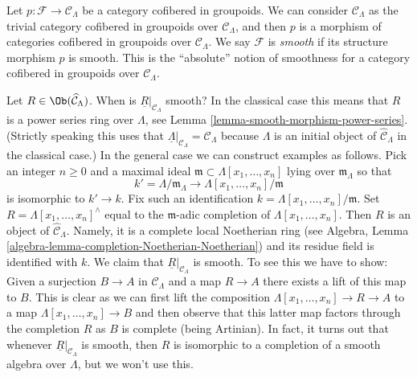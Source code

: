 \begin{remark}
\label{remark-cofibered-groupoid-projection-smooth}
Let $p : \mathcal{F} \to \mathcal{C}_\Lambda$ be a category cofibered in
groupoids. We can consider $\mathcal{C}_\Lambda$ as the trivial category
cofibered in groupoids over $\mathcal{C}_\Lambda$, and then $p$ is a morphism
of categories cofibered in groupoids over $\mathcal{C}_\Lambda$. We say
$\mathcal{F}$ is {\it smooth} if its structure morphism $p$ is smooth.
This is the ``absolute'' notion of smoothness for a category cofibered in
groupoids over $\mathcal{C}_\Lambda$.
\end{remark}

\begin{example}
\label{example-smooth}
Let $R \in \Ob(\widehat{\mathcal{C}}_\Lambda)$.
When is $\underline{R}|_{\mathcal{C}_\Lambda}$ smooth?
In the classical case this means that $R$ is a power series
ring over $\Lambda$, see
Lemma \ref{lemma-smooth-morphism-power-series}.
(Strictly speaking this uses that
$\underline{\Lambda}|_{\mathcal{C}_\Lambda} = \mathcal{C}_\Lambda$
because $\Lambda$ is an initial object of $\widehat{\mathcal{C}}_\Lambda$
in the classical case.) In the general case we can construct examples
as follows. Pick an integer $n \geq 0$ and a maximal ideal
$\mathfrak m \subset \Lambda[x_1, \ldots, x_n]$ lying over
$\mathfrak m_\Lambda$ so that
$$
k' = \Lambda/\mathfrak m_\Lambda
\longrightarrow
\Lambda[x_1, \ldots, x_n]/\mathfrak m
$$
is isomorphic to $k' \to k$. Fix such an identification
$k = \Lambda[x_1, \ldots, x_n]/\mathfrak m$. Set
$R = \Lambda[x_1, \ldots, x_n]^\wedge$ equal to the $\mathfrak m$-adic
completion of $\Lambda[x_1, \ldots, x_n]$. Then $R$ is an object of
$\widehat{\mathcal{C}}_\Lambda$. Namely, it is a complete local
Noetherian ring (see
Algebra, Lemma \ref{algebra-lemma-completion-Noetherian-Noetherian})
and its residue field is identified with $k$.
We claim that $\underline{R}|_{\mathcal{C}_\Lambda}$ is smooth. To see
this we have to show: Given a surjection $B \to A$ in $\mathcal{C}_\Lambda$
and a map $R \to A$ there exists a lift of this map to $B$. This is clear
as we can first lift the composition
$\Lambda[x_1, \ldots, x_n] \to R \to A$ to a map
$\Lambda[x_1, \ldots, x_n] \to B$ and then observe that this latter map
factors through the completion $R$ as $B$ is complete (being Artinian).
In fact, it turns out that whenever $\underline{R}|_{\mathcal{C}_\Lambda}$
is smooth, then $R$ is isomorphic to a completion of a smooth
algebra over $\Lambda$, but we won't use this.
\end{example}

